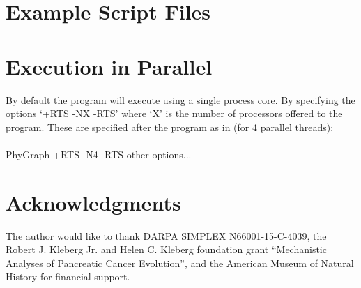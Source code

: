 \documentclass[11pt]{article}
\begin{document}
%	

	\section{Example Script Files}
	
	\section{Execution in Parallel}
	By default the program will execute using a single process core.  By specifying the options `+RTS -NX -RTS' where `X' is the number of processors offered to the program. These are specified after the program as in (for 4 parallel threads):\\
	\\
	PhyGraph +RTS -N4 -RTS other options...  \\
	
	\section*{Acknowledgments}
	The author would like to thank DARPA SIMPLEX N66001-15-C-4039, the  Robert J. Kleberg Jr. and Helen C. Kleberg foundation grant ``Mechanistic Analyses of Pancreatic Cancer Evolution'', and the American Museum of Natural History for financial support.  
	
	\newpage
	
\end{document}

